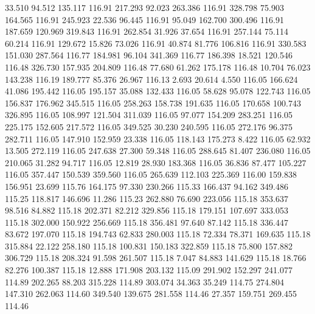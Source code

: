   33.510   94.512  135.117       116.91
 217.293   92.023  263.386       116.91
 328.798   75.903  164.565       116.91
 245.923   22.536   96.445       116.91
  95.049  162.700  300.496       116.91
 187.659  120.969  319.843       116.91
 262.854   31.926   37.654       116.91
 257.144   75.114   60.214       116.91
 129.672   15.826   73.026       116.91
  40.874   81.776  106.816       116.91
 330.583  151.030  287.564       116.77
 184.981   96.104  341.369       116.77
 186.398   18.521  120.546       116.48
 326.730  157.935  204.809       116.48
  77.680   61.262  175.178       116.48
  10.704   76.023  143.238       116.19
 189.777   85.376   26.967       116.13
   2.693   20.614    4.550       116.05
 166.624   41.086  195.442       116.05
 195.157   35.088  132.433       116.05
  58.628   95.078  122.743       116.05
 156.837  176.962  345.515       116.05
 258.263  158.738  191.635       116.05
 170.658  100.743  326.895       116.05
 108.997  121.504  311.039       116.05
  97.077  154.209  283.251       116.05
 225.175  152.605  217.572       116.05
 349.525   30.230  240.595       116.05
 272.176   96.375  282.711       116.05
 147.910  152.959   23.338       116.05
 118.143  175.273    8.422       116.05
  62.932   13.505  272.119       116.05
 247.638   27.300   59.348       116.05
 288.645   81.407  236.080       116.05
 210.065   31.282   94.717       116.05
  12.819   28.930  183.368       116.05
  36.836   87.477  105.227       116.05
 357.447  150.539  359.560       116.05
 265.639  112.103  225.369       116.00
 159.838  156.951   23.699       115.76
 164.175   97.330  230.266       115.33
 166.437   94.162  349.486       115.25
 118.817  146.696   11.286       115.23
 262.880   76.690  223.056       115.18
 353.637   98.516   84.882       115.18
 202.371   82.212  329.856       115.18
 179.151  107.697  333.053       115.18
 302.000  150.922  256.669       115.18
 356.481   97.640   87.142       115.18
 336.447   83.672  197.070       115.18
 194.743   62.833  280.003       115.18
  72.334   78.371  169.635       115.18
 315.884   22.122  258.180       115.18
 100.831  150.183  322.859       115.18
  75.800  157.882  306.729       115.18
 208.324   91.598  261.507       115.18
   7.047   84.883  141.629       115.18
  18.766   82.276  100.387       115.18
  12.888  171.908  203.132       115.09
 291.902  152.297  241.077       114.89
 202.265   88.203  315.228       114.89
 303.074   34.363   35.249       114.75
 274.804  147.310  262.063       114.60
 349.540  139.675  281.558       114.46
  27.357  159.751  269.455       114.46
